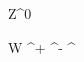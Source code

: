 
\newmathsymbol{\Zboson}      {Z^0}

\newmathsymbol{\Wboson}      {W}
\newmathsymbol{\Wp}          {\Wboson^+}
\newmathsymbol{\Wm}          {\Wboson^-}
\newmathsymbol{\Wpm}         {\Wboson^\pm}

\newmathsymbol{\photon}      {\gamma}
